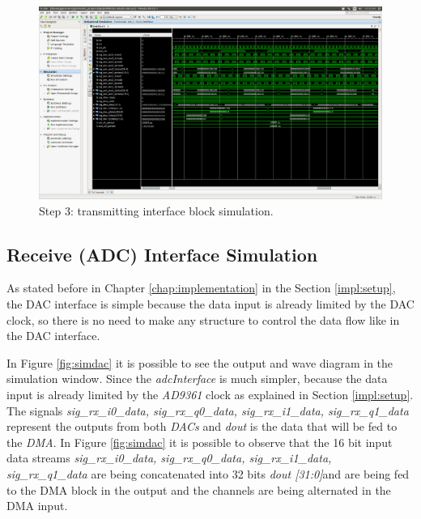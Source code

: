 \begin{figure}[htbp]
    \centering
    \includegraphics[width=1\textwidth,
    trim={{.67\textwidth} {.7\textwidth} {.05\textwidth} {.3\textwidth}},
    clip]{./figures/txInterface}
    \caption{ Step 3: transmitting interface block simulation.
    \label{fig:simtxif}}
\end{figure}

\subsection{Receive (ADC) Interface Simulation}

As stated before in Chapter \ref{chap:implementation} in the Section
\ref{impl:setup}, the DAC interface is simple because the data input is already
limited by the DAC clock, so there is no need to make any structure to control
the data flow like in the DAC interface.

In Figure \ref{fig:simdac} it is possible to see the output and wave diagram in
the simulation window. Since the \textit{adcInterface} is much simpler, because
the data input is already limited by the \textit{AD9361} clock as explained in
Section \ref{impl:setup}. The signals \textit{sig\_rx\_i0\_data,
sig\_rx\_q0\_data, sig\_rx\_i1\_data, sig\_rx\_q1\_data} represent the outputs
from both \textit{DACs} and \textit{dout} is the data that will be fed to the
\textit{DMA}. In Figure \ref{fig:simdac} it is possible to observe that the 16
bit input data streams \textit{sig\_rx\_i0\_data, sig\_rx\_q0\_data,
sig\_rx\_i1\_data, sig\_rx\_q1\_data} are being concatenated into 32 bits
\textit{dout [31:0]}and are being fed to the DMA block in the output and the
channels are being alternated in the DMA input.

